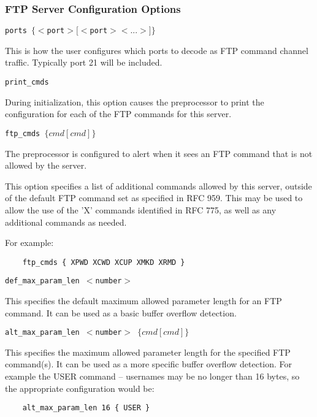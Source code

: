 \documentclass[english]{report}
\newcounter{slistnum}
\newenvironment{slist}
{ \begin{list}{ {\bf \arabic{slistnum}.} }{\usecounter{slistnum} } }
{ \end{list} }
\begin{document}
\subsubsection{FTP Server Configuration Options}

\begin{slist}
\item \texttt{ports $\{ <$port$> [<$port$> <...>] \}$}

This is how the user configures which ports to decode as FTP command channel
traffic.  Typically port 21 will be included.

\item \texttt{print\_cmds}

During initialization, this option causes the preprocessor to print the
configuration for each of the FTP commands for this server.  

\item \texttt{ftp\_cmds $\{ cmd [cmd] \}$ }

The preprocessor is configured to alert when it sees an FTP command that is not
allowed by the server.

This option specifies a list of additional commands allowed by this server,
outside of the default FTP command set as specified in RFC 959.  This may be
used to allow the use of the 'X' commands identified in RFC 775, as well as any
additional commands as needed.

For example:

\begin{verbatim}
    ftp_cmds { XPWD XCWD XCUP XMKD XRMD }
\end{verbatim}

\item \texttt{def\_max\_param\_len $<$number$>$}

This specifies the default maximum allowed parameter length for an FTP command.
It can be used as a basic buffer overflow detection.

\item \texttt{alt\_max\_param\_len $<$number$>$ $\{ cmd [cmd] \}$}

This specifies the maximum allowed parameter length for the specified FTP
command(s).  It can be used as a more specific buffer overflow detection.  For
example the USER command -- usernames may be no longer than 16 bytes, so the
appropriate configuration would be:

\begin{verbatim}
    alt_max_param_len 16 { USER }
\end{verbatim}


\end{slist}
\end{document}
